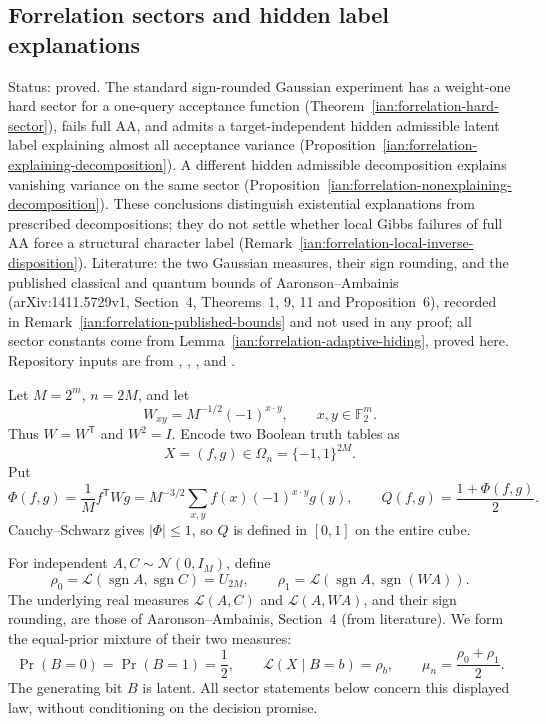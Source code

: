 \subsection{Forrelation sectors and hidden label explanations}\label{ian:forrelation-sectors}

Status: proved. The standard sign-rounded Gaussian experiment has a weight-one hard sector for a one-query acceptance function (Theorem~\ref{ian:forrelation-hard-sector}), fails full AA, and admits a target-independent hidden admissible latent label explaining almost all acceptance variance (Proposition~\ref{ian:forrelation-explaining-decomposition}). A different hidden admissible decomposition explains vanishing variance on the same sector (Proposition~\ref{ian:forrelation-nonexplaining-decomposition}). These conclusions distinguish existential explanations from prescribed decompositions; they do not settle whether local Gibbs failures of full AA force a structural character label (Remark~\ref{ian:forrelation-local-inverse-disposition}). Literature: the two Gaussian measures, their sign rounding, and the published classical and quantum bounds of Aaronson--Ambainis (arXiv:1411.5729v1, Section~4, Theorems~1, 9, 11 and Proposition~6), recorded in Remark~\ref{ian:forrelation-published-bounds} and not used in any proof; all sector constants come from Lemma~\ref{ian:forrelation-adaptive-hiding}, proved here. Repository inputs are from , , ,  and .

\begin{definition}\label{ian:forrelation-input-law}
Let \(M=2^m\), \(n=2M\), and let
\[
 W_{xy}=M^{-1/2}(-1)^{x\cdot y},
 \qquad x,y\in\mathbb F_2^m.
\]
Thus \(W=W^{\mathsf T}\) and \(W^2=I\). Encode two Boolean truth tables as
\[
 X=(f,g)\in\Omega_n=\{-1,1\}^{2M}.
\]
Put
\[
 \Phi(f,g)=\frac1M f^{\mathsf T}Wg
 =M^{-3/2}\sum_{x,y}f(x)(-1)^{x\cdot y}g(y),
 \qquad Q(f,g)=\frac{1+\Phi(f,g)}2.
\]
Cauchy--Schwarz gives \(|\Phi|\le1\), so \(Q\) is defined in \([0,1]\) on the entire cube.

For independent \(A,C\sim\mathcal N(0,I_M)\), define
\[
 \rho_0=\mathcal L(\operatorname{sgn}A,\operatorname{sgn}C)=U_{2M},
 \qquad
 \rho_1=\mathcal L(\operatorname{sgn}A,\operatorname{sgn}(WA)).
\]
The underlying real measures \(\mathcal L(A,C)\) and \(\mathcal L(A,WA)\), and their sign rounding, are those of Aaronson--Ambainis, Section~4 (from literature). We form the equal-prior mixture of their two measures:
\[
 \Pr(B=0)=\Pr(B=1)=\frac12,\qquad
 \mathcal L(X\mid B=b)=\rho_b,\qquad
 \mu_n=\frac{\rho_0+\rho_1}{2}.
\]
The generating bit \(B\) is latent. All sector statements below concern this displayed law, without conditioning on the decision promise.
\end{definition}


